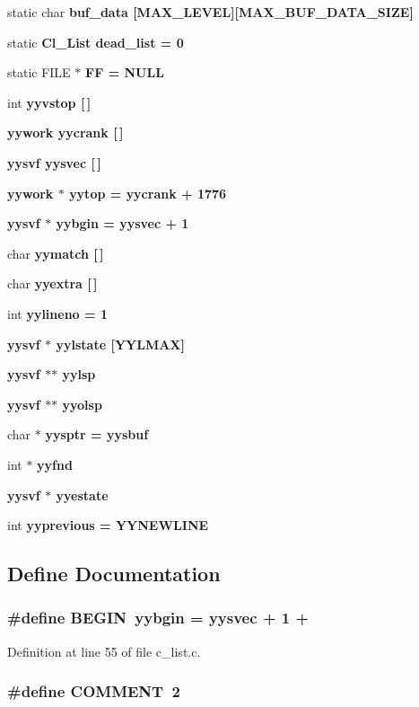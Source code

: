 \begin{CompactItemize}
\item 
static char \bf{buf\_\-data} [MAX\_\-LEVEL][MAX\_\-BUF\_\-DATA\_\-SIZE]
\item 
static \bf{Cl\_\-List} \bf{dead\_\-list} = 0
\item 
static FILE $\ast$ \bf{FF} = NULL
\item 
int \bf{yyvstop} [$\,$]
\item 
\bf{yywork} \bf{yycrank} [$\,$]
\item 
\bf{yysvf} \bf{yysvec} [$\,$]
\item 
\bf{yywork} $\ast$ \bf{yytop} = \bf{yycrank} + 1776
\item 
\bf{yysvf} $\ast$ \bf{yybgin} = \bf{yysvec} + 1
\item 
char \bf{yymatch} [$\,$]
\item 
char \bf{yyextra} [$\,$]
\item 
int \bf{yylineno} = 1
\item 
\bf{yysvf} $\ast$ \bf{yylstate} [YYLMAX]
\item 
\bf{yysvf} $\ast$$\ast$ \bf{yylsp}
\item 
\bf{yysvf} $\ast$$\ast$ \bf{yyolsp}
\item 
char $\ast$ \bf{yysptr} = \bf{yysbuf}
\item 
int $\ast$ \bf{yyfnd}
\item 
\bf{yysvf} $\ast$ \bf{yyestate}
\item 
int \bf{yyprevious} = YYNEWLINE
\end{CompactItemize}


\subsection{Define Documentation}
\subsubsection{\setlength{\rightskip}{0pt plus 5cm}\#define BEGIN~\bf{yybgin} = \bf{yysvec} + 1 +}\label{c__list_8c_b766bbbee08d04b67e3fe599d6900873}




Definition at line 55 of file c\_\-list.c.
\subsubsection{\setlength{\rightskip}{0pt plus 5cm}\#define COMMENT~2}\label{c__list_8c_180f5b3835bdbfc11b353fd2af5c8659}




